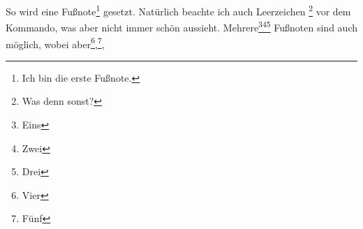 \documentclass[a5paper]{article}
\begin{document}
So wird eine Fußnote\footnote{Ich bin die erste Fußnote.} gesetzt. Natürlich beachte ich auch Leerzeichen \footnote{Was denn sonst?}
vor dem Kommando, was aber nicht immer schön aussieht.
Mehrere\footnote{Eins}\footnote{Zwei}\footnote{Drei} Fußnoten sind auch möglich,
wobei aber\footnote{Vier},\footnote{Fünf}, 
 
\end{document}
